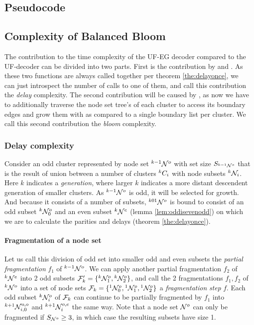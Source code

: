 \subsection{Pseudocode}

\subsection{Complexity of Balanced Bloom}

The contribution to the time complexity of the UF-EG decoder compared to the UF-decoder can be divided into two parts. First is the contribution by  and . As these two functions are always called together per theorem \ref{the:delayonce}, we can just introspect the number of calls to one of them, and call this contribution the \emph{delay} complexity. The second contribution will be caused by , as now we have to additionally traverse the node set tree's of each cluster to access its boundary edges and grow them with  as compared to a single boundary list per cluster. We call this second contribution the \emph{bloom} complexity.

\subsubsection{Delay complexity}

Consider an odd cluster represented by node set ${}^{k-1}\mathcal{N}^o$ with set size $S_{{}^{k-1}\mathcal{N}^o}$ that is the result of union between a number of clusters ${}^{k}C_i$ with node subsets ${}^{k}\mathcal{N}_i$. Here $k$ indicates a \emph{generation}, where larger $k$ indicates a more distant descendent generation of smaller clusters. As ${}^{k-1}\mathcal{N}^o$ is odd, it will be selected for growth. And because it consists of a number of subsets, ${}^{k01}\mathcal{N}^o$ is bound to consist of an odd subset ${}^{k}\mathcal{N}^o_0$ and an even subset ${}^{k}\mathcal{N}^e$ (lemma \ref{lem:oddisevenodd}) on which we are to calculate the parities and delays (theorem \ref{the:delayonce}).

\paragraph{Fragmentation of a node set}

Let us call this division of odd set into smaller odd and even subsets the \emph{partial fragmentation} $f_1$ of ${}^{k-1}\mathcal{N}^o$. We can apply another partial fragmentation $f_2$ of ${}^{k}\mathcal{N}^e$ into 2 odd subsets $\mathcal{F}'_k=\{{}^{k}\mathcal{N}^{o}_1, {}^{k}\mathcal{N}^{o}_2\}$, and call the 2 fragmentations $f_1, f_2$ of ${}^{k}\mathcal{N}^o$ into a set of node sets $\mathcal{F}_k = \{{}^{1}\mathcal{N}^o_0, {}^{1}\mathcal{N}^{o}_1, {}^{1}\mathcal{N}^{o}_2\}$ a \emph{fragmentation step} $f$. Each odd subset ${}^{k}\mathcal{N}^o_i$ of $\mathcal{F}_k$ can continue to be partially fragmented by $f_1$ into ${}^{k+1}\mathcal{N}^{o,o}_{i, 0}$ and ${}^{k+1}\mathcal{N}^{o,e}_i$ the same way. Note that a node set $\mathcal{N}^o$ can only be fragmented if $S_{\mathcal{N}^o} \geq 3$, in which case the resulting subsets have size 1.


